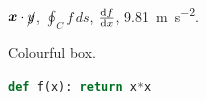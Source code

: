 \documentclass{article}
\begin{document}
\begin{theorem}\label{t} $\bm{x}\cdot\cancel{y}$, $\oint_C f\,ds$, $\dv{f}{x}$, \SI{9.81}{\meter\per\second\squared}. \end{theorem}
\begin{tcolorbox}[title=Box]Colourful box.\end{tcolorbox}
\begin{lstlisting}[language=Python]
def f(x): return x*x
\end{lstlisting}
\begin{algorithm}[H]\end{algorithm}
\end{document}
